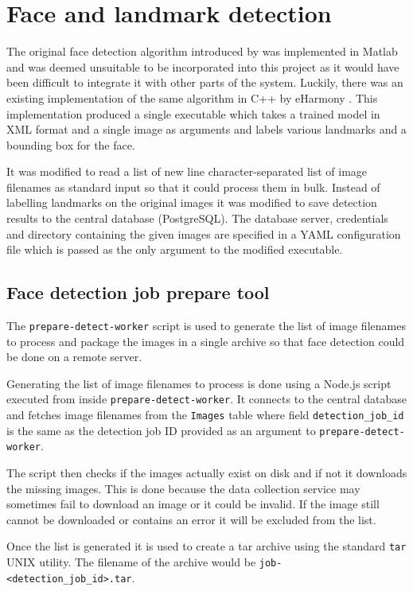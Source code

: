 \section{Face and landmark detection}
\label{impl:fd}
The original face detection algorithm introduced by \citep{zhu2012face} was
implemented in Matlab and was deemed unsuitable to be incorporated into this
project as it would have been difficult to integrate it with other parts of the
system. Luckily, there was an existing implementation of the same algorithm in
C++ by eHarmony \citep{eHphotofeature}. This implementation produced a single
executable which takes a trained model in XML format and a single image as
arguments and labels various landmarks and a bounding box for the face. 

It was modified to read a list of new line character-separated list of image
filenames as standard input so that it could process them in bulk. Instead of
labelling landmarks on the original images it was modified to save detection
results to the central database (PostgreSQL). The database server, credentials
and directory containing the given images are specified in a YAML configuration
file which is passed as the only argument to the modified executable.

\subsection{Face detection job prepare tool}
The \texttt{prepare-detect-worker} script is used to generate the list of image
filenames to process and package the images in a single archive so that face
detection could be done on a remote server.

Generating the list of image filenames to process is done using a Node.js
script executed from inside \texttt{prepare-detect-worker}. It connects to the
central database and fetches image filenames from the \texttt{Images} table
where field \texttt{detection\_job\_id} is the same as the detection job ID
provided as an argument to \texttt{prepare-detect-worker}.

The script then checks if the images actually exist on disk and if not it
downloads the missing images. This is done because the data collection service
may sometimes fail to download an image or it could be invalid. If the image
still cannot be downloaded or contains an error it will be excluded from the
list.

Once the list is generated it is used to create a tar archive using the
standard \texttt{tar} UNIX utility. The filename of the archive would be
\texttt{job-<detection\_job\_id>.tar}.

